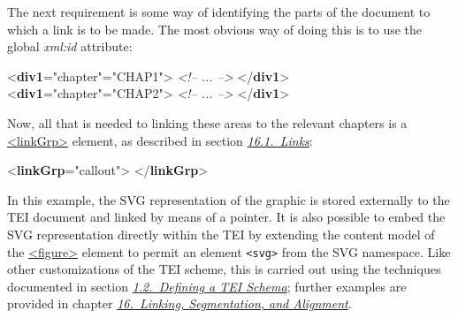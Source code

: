 The next requirement is some way of identifying the parts of the document to which a link is to be made. The most obvious way of doing this is to use the global {\itshape xml:id} attribute: \par\bgroup{}\exampleFont \begin{shaded}\noindent\mbox{}{<\textbf{div1}\hspace*{1em}{type}="{chapter}"\hspace*{1em}{xml:id}="{CHAP1}">}\mbox{}\newline 
\textit{<!-- ... -->}\mbox{}\newline 
{</\textbf{div1}>}\mbox{}\newline 
{<\textbf{div1}\hspace*{1em}{type}="{chapter}"\hspace*{1em}{xml:id}="{CHAP2}">}\mbox{}\newline 
\textit{<!-- ... -->}\mbox{}\newline 
{</\textbf{div1}>}\end{shaded}\egroup\par \par
Now, all that is needed to linking these areas to the relevant chapters is a \hyperref[TEI.linkGrp]{<linkGrp>} element, as described in section \textit{\hyperref[SAPT]{16.1.\ Links}}: \par\bgroup{}\exampleFont \begin{shaded}\noindent\mbox{}{<\textbf{linkGrp}\hspace*{1em}{type}="{callout}">}\mbox{}\newline 
{}\mbox{}\newline 
{}\mbox{}\newline 
{</\textbf{linkGrp}>}\end{shaded}\egroup\par \par
In this example, the SVG representation of the graphic is stored externally to the TEI document and linked by means of a pointer. It is also possible to embed the SVG representation directly within the TEI by extending the content model of the \hyperref[TEI.figure]{<figure>} element to permit an element \texttt{<svg>} from the SVG namespace. Like other customizations of the TEI scheme, this is carried out using the techniques documented in section \textit{\hyperref[STIN]{1.2.\ Defining a TEI Schema}}; further examples are provided in chapter \textit{\hyperref[SA]{16.\ Linking, Segmentation, and Alignment}}.
